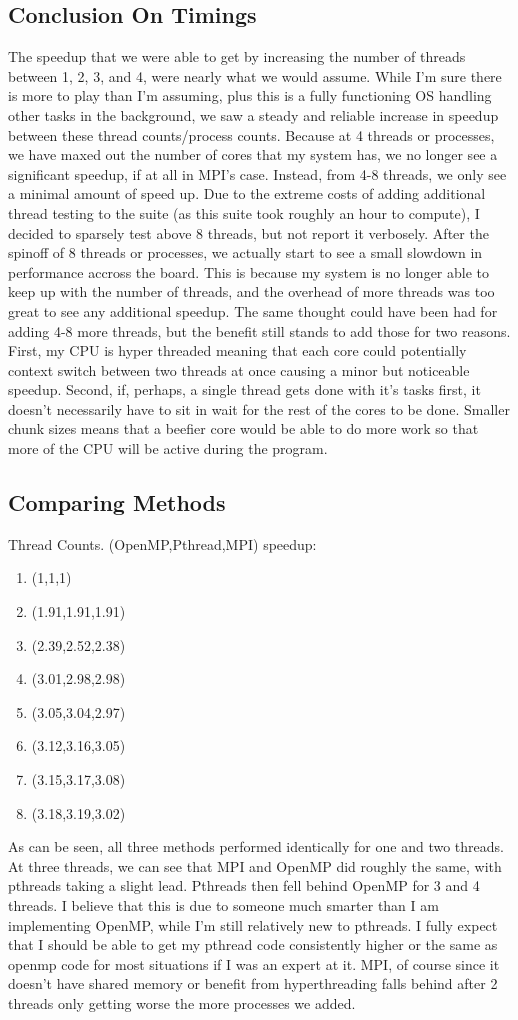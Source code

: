 \documentclass{article}
\begin{document}
\subsection*{Conclusion On Timings}
The speedup that we were able to get by increasing the number of threads between 1, 2, 3, and 4, were nearly what we would assume. While I'm sure there is more to play than I'm assuming, plus this is a fully functioning OS handling other tasks in the background, we saw a steady and reliable increase in speedup between these thread counts/process counts. Because at 4 threads or processes, we have maxed out the number of cores that my system has, we no longer see a significant speedup, if at all in MPI's case. Instead, from 4-8 threads, we only see a minimal amount of speed up. Due to the extreme costs of adding additional thread testing to the suite (as this suite took roughly an hour to compute), I decided to sparsely test above 8 threads, but not report it verbosely. After the spinoff of 8 threads or processes, we actually start to see a small slowdown in performance accross the board. This is because my system is no longer able to keep up with the number of threads, and the overhead of more threads was too great to see any additional speedup. The same thought could have been had for adding 4-8 more threads, but the benefit still stands to add those for two reasons. First, my CPU is hyper threaded meaning that each core could potentially context switch between two threads at once causing a minor but noticeable speedup. Second, if, perhaps, a single thread gets done with it's tasks first, it doesn't necessarily have to sit in wait for the rest of the cores to be done. Smaller chunk sizes means that a beefier core would be able to do more work so that more of the CPU will be active during the program.
\subsection*{Comparing Methods}
Thread Counts. (OpenMP,Pthread,MPI) speedup:
\begin{enumerate}
	\item (1,1,1)
	\item (1.91,1.91,1.91)
	\item (2.39,2.52,2.38)
	\item (3.01,2.98,2.98)
	\item (3.05,3.04,2.97)
	\item (3.12,3.16,3.05)
	\item (3.15,3.17,3.08)
	\item (3.18,3.19,3.02)
\end{enumerate}
As can be seen, all three methods performed identically for one and two threads. At three threads, we can see that MPI and OpenMP did roughly the same, with pthreads taking a slight lead. Pthreads then fell behind OpenMP for 3 and 4 threads. I believe that this is due to someone much smarter than I am implementing OpenMP, while I'm still relatively new to pthreads. I fully expect that I should be able to get my pthread code consistently higher or the same as openmp code for most situations if I was an expert at it. MPI, of course since it doesn't have shared memory or benefit from hyperthreading falls behind after 2 threads only getting worse the more processes we added.
\end{document}
